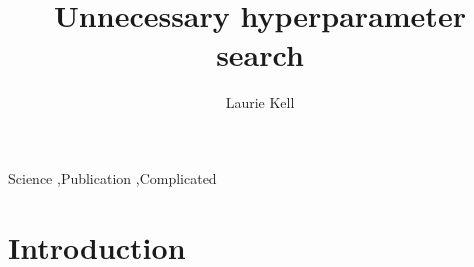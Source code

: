 \documentclass[preprint,review,12pt]{elsarticle}
\begin{document}
\begin{frontmatter}


\title{Unnecessary hyperparameter search}




\author{Laurie Kell}

\address{Henstead, UK}

\begin{abstract}

\end{abstract}

\begin{keyword}
Science \sep Publication \sep Complicated


\end{keyword}

\end{frontmatter}

\linenumbers

\section{Introduction}
\label{S:1}
\end{document}
